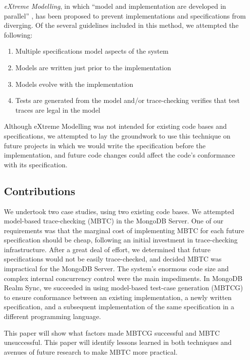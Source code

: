 \documentclass{vldb}
\begin{document}
\textit{eXtreme Modelling}, in which ``model and implementation are developed in parallel'' \cite{Gravell11ConcurrentDevelopmentOfModelAndImplementation}, has been proposed to prevent implementations and specifications from diverging.
Of the several guidelines included in this method, we attempted the following:
\begin{enumerate}[itemsep=-0.5ex]
  \item Multiple specifications model aspects of the system
  \item Models are written just prior to the implementation
  \item Models evolve with the implementation
  \item Tests are generated from the model and/or trace-checking verifies that test traces are legal in the model
\end{enumerate}

Although eXtreme Modelling was not intended for existing code bases and specifications, we attempted to lay the groundwork to use this technique on future projects in which we would write the specification before the implementation, and future code changes could affect the code's conformance with its specification.

\subsection{Contributions}

We undertook two case studies, using two existing code bases.
We attempted model-based trace-checking (MBTC) in the MongoDB Server.
One of our requirements was that the marginal cost of implementing MBTC for each future specification should be cheap, following an initial investment in trace-checking infrastructure.
After a great deal of effort, we determined that future specifications would not be easily trace-checked, and decided MBTC was impractical for the MongoDB Server.
The system's enormous code size and complex internal concurrency control were the main impediments.
In MongoDB Realm Sync, we succeeded in using model-based test-case generation (MBTCG) to ensure conformance between an existing implementation, a newly written specification, and a subsequent implementation of the same specification in a different programming language.

This paper will show what factors made MBTCG successful and MBTC unsuccessful.
This paper will identify lessons learned in both techniques and avenues of future research to make MBTC more practical.
\end{document}
